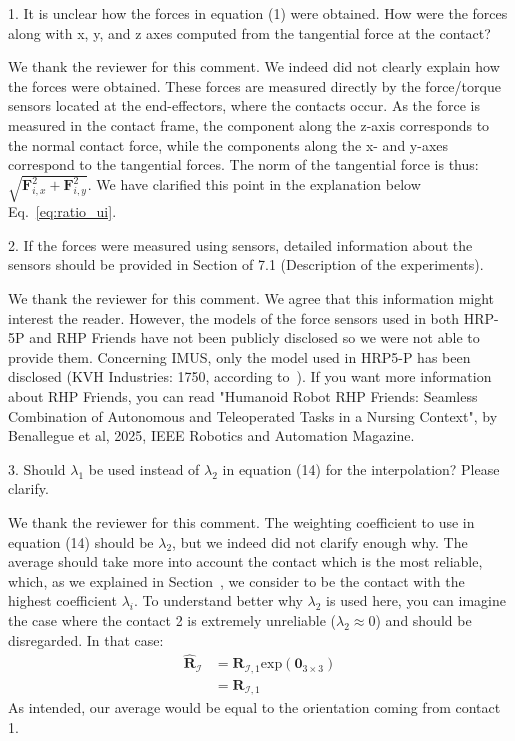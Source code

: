 \begin{revquote}
1. It is unclear how the forces in equation (1) were obtained. How were the forces along with x, y, and z axes computed from the tangential force at the contact?
\end{revquote}

We thank the reviewer for this comment. We indeed did not clearly explain how the forces were obtained. These forces are measured directly by the force/torque sensors located at the end-effectors, where the contacts occur. As the force is measured in the contact frame, the component along the z-axis corresponds to the normal contact force, while the components along the x- and y-axes correspond to the tangential forces. The norm of the tangential force is thus:
$\sqrt{\boldsymbol{F}_{i,x}^2 + \boldsymbol{F}_{i,y}^2}$. We have clarified this point in the explanation below Eq.~\eqref{eq:ratio_ui}.

\begin{revquote}
2. If the forces were measured using sensors, detailed information about the sensors should be provided in Section of 7.1 (Description of the experiments).
\end{revquote}

We thank the reviewer for this comment. We agree that this information might interest the reader. However, the models of the force sensors used in both HRP-5P and RHP Friends have not been publicly disclosed so we were not able to provide them. Concerning IMUS, only the model used in HRP5-P has been disclosed (KVH Industries: 1750, according to~\cite{Kaneko2019Hrp5}). 
If you want more information about RHP Friends, you can read "Humanoid Robot RHP Friends: Seamless Combination of Autonomous and Teleoperated Tasks in a Nursing Context", by Benallegue et al, 2025, IEEE Robotics and Automation Magazine.

\begin{revquote}
3. Should $\lambda_1$ be used instead of $\lambda_2$ in equation (14) for the interpolation? Please clarify.
\end{revquote}

We thank the reviewer for this comment. The weighting coefficient to use in equation (14) should be $\lambda_2$, but we indeed did not clarify enough why. The average should take more into account the contact which is the most reliable, which, as we explained in Section~\label{sec:anchor_point}, we consider to be the contact with the highest coefficient $\lambda_{i}$.
To understand better why $\lambda_{2}$ is used here, you can imagine the case where the contact 2 is extremely unreliable ($\lambda_{2} \approx 0$) and should be disregarded. In that case:
\begin{align}
    \hat{\boldsymbol{R}}_{\mathcal{I}}& = \boldsymbol{R}_{\mathcal{I}, 1} \text{exp} \left( \boldsymbol{0}_{3\times3}  \right) \\ 
    & =  \boldsymbol{R}_{\mathcal{I}, 1} 
\end{align} 
As intended, our average would be equal to the orientation coming from contact 1.

